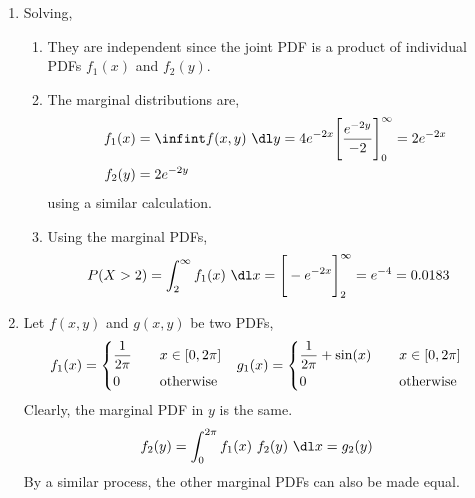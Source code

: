 \begin{enumerate}
    \item Solving,
          \begin{enumerate}
              \item They are independent since the joint PDF is a product of individual
                    PDFs $ f_1(x) $ and $ f_2(y) $.

              \item The marginal distributions are,
                    \begin{align}
                        f_1(x) & = \infint f(x,y)\ \dl y = 4e^{-2x}
                        \Bigg[\frac{e^{-2y}}{-2}\Bigg]_0^\infty = 2e^{-2x} \\
                        f_2(y) & = 2e^{-2y}
                    \end{align}
                    using a similar calculation.

              \item Using the marginal PDFs,
                    \begin{align}
                        P(X > 2) & = \int_{2}^{\infty} f_1(x)\ \dl x
                        = \Bigg[-e^{-2x}\Bigg]_2^\infty = e^{-4} = 0.0183
                    \end{align}
          \end{enumerate}

    \item Let $ f(x,y) $ and $ g(x,y) $ be two PDFs,
          \begin{align}
              f_1(x) & = \begin{dcases}
                             \frac{1}{2\pi} & \quad x \in [0,2\pi]   \\
                             0              & \quad \text{otherwise} \\
                         \end{dcases}           &
              g_1(x) & = \begin{dcases}
                             \frac{1}{2\pi} + \sin(x) & \quad x \in [0,2\pi]   \\
                             0                        & \quad \text{otherwise} \\
                         \end{dcases}
          \end{align}
          Clearly, the marginal PDF in $ y $ is the same.
          \begin{align}
              f_2(y) & = \int_{0}^{2\pi} f_1(x)\ f_2(y)\ \dl x = g_2(y)
          \end{align}
          By a similar process, the other marginal PDFs can also be made equal.


\end{enumerate}
